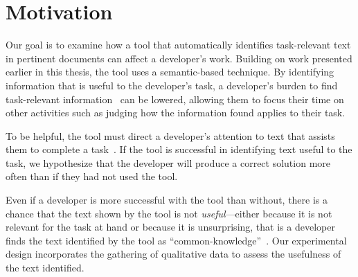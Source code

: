 


\section{Motivation}
\label{cp6:method}



Our goal is to examine how a tool that 
automatically identifies
task-relevant text in pertinent
documents  can affect a developer's work.
Building on work presented earlier in this
thesis, the tool uses a semantic-based technique.
By identifying information that is useful to the developer's task,
a developer's burden to find task-relevant information~\cite{Robillard2015}
can be lowered,
allowing them to focus their time on other activities such as judging how the information found applies to their task.


To be helpful, the tool must direct a developer's attention to text that assists them to complete a task~\cite{Robillard2015}.
If the tool is successful in identifying text useful to the task, we hypothesize that
the developer will produce a correct solution more often than if they had not used the tool.





Even if a developer is more successful
with the tool than without, there is a chance that the text shown by the tool is not \textit{useful}---either because it is not relevant for the task at hand or because it is unsurprising, that is
a developer finds the text identified by the tool as ``common-knowledge''~\cite{cwalina2008, Robillard2015}. Our experimental design incorporates the gathering of qualitative data to assess the usefulness of the text identified.

 




